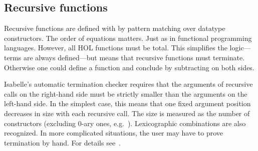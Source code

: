 \begin{isabellebody}
\begin{isamarkuptext}
\subsection{Recursive functions}
\label{sec:recursive-funs}

Recursive functions are defined with  by pattern matching
over datatype constructors. The order of equations matters. Just as in
functional programming languages. However, all HOL functions must be
total. This simplifies the logic---terms are always defined---but means
that recursive functions must terminate. Otherwise one could define a
function  and conclude \mbox{} by
subtracting  on both sides.

Isabelle's automatic termination checker requires that the arguments of
recursive calls on the right-hand side must be strictly smaller than the
arguments on the left-hand side. In the simplest case, this means that one
fixed argument position decreases in size with each recursive call. The size
is measured as the number of constructors (excluding 0-ary ones, e.g.\ ). Lexicographic combinations are also recognized. In more complicated
situations, the user may have to prove termination by hand. For details
see~\cite{Krauss}.


\end{isamarkuptext}
\end{isabellebody}
